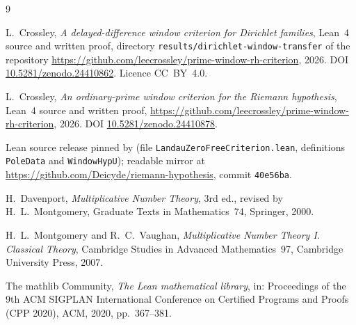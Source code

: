 \documentclass[11pt]{amsart}
\theoremstyle{definition}
\theoremstyle{remark}
\newcommand{\lean}[1]{\texttt{#1}}
\begin{document}
\begin{thebibliography}{9}

L.~Crossley, \emph{A delayed-difference window criterion for Dirichlet families}, Lean~4 source and
written proof, directory \texttt{results/dirichlet-window-transfer} of the repository
\url{https://github.com/leecrossley/prime-window-rh-criterion}, 2026.
DOI \href{https://doi.org/10.5281/zenodo.24410862}{10.5281/zenodo.24410862}. Licence CC~BY~4.0.

L.~Crossley, \emph{An ordinary-prime window criterion for the Riemann hypothesis}, Lean~4 source and
written proof, \url{https://github.com/leecrossley/prime-window-rh-criterion}, 2026.
DOI \href{https://doi.org/10.5281/zenodo.24410878}{10.5281/zenodo.24410878}.

Lean source release pinned by \cite{Crossley-transfer} (file
\texttt{LandauZeroFreeCriterion.lean}, definitions \lean{PoleData} and \lean{WindowHypU});
readable mirror at \url{https://github.com/Deicyde/riemann-hypothesis}, commit \texttt{40e56ba}.

H.~Davenport, \emph{Multiplicative Number Theory}, 3rd ed., revised by H.~L.~Montgomery,
Graduate Texts in Mathematics~74, Springer, 2000.

H.~L.~Montgomery and R.~C.~Vaughan, \emph{Multiplicative Number Theory I. Classical Theory},
Cambridge Studies in Advanced Mathematics~97, Cambridge University Press, 2007.

The mathlib Community, \emph{The Lean mathematical library}, in: Proceedings of the 9th ACM SIGPLAN
International Conference on Certified Programs and Proofs (CPP 2020), ACM, 2020, pp.~367--381.

\end{thebibliography}
\end{document}
